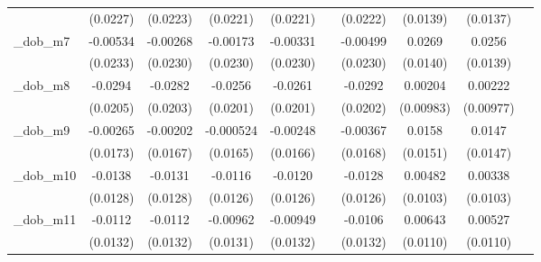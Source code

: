 \begin{table}[htbp]
\begin{tabular}{l*{9}{c}}
            &    (0.0227)         &    (0.0223)         &    (0.0221)         &    (0.0221)         &                     &    (0.0222)         &    (0.0139)         &    (0.0137)         &                     \\
[1em]
\_dob\_m7     &    -0.00534         &    -0.00268         &    -0.00173         &    -0.00331         &                     &    -0.00499         &      0.0269\sym{*}  &      0.0256\sym{*}  &                     \\
            &    (0.0233)         &    (0.0230)         &    (0.0230)         &    (0.0230)         &                     &    (0.0230)         &    (0.0140)         &    (0.0139)         &                     \\
[1em]
\_dob\_m8     &     -0.0294         &     -0.0282         &     -0.0256         &     -0.0261         &                     &     -0.0292         &     0.00204         &     0.00222         &                     \\
            &    (0.0205)         &    (0.0203)         &    (0.0201)         &    (0.0201)         &                     &    (0.0202)         &   (0.00983)         &   (0.00977)         &                     \\
[1em]
\_dob\_m9     &    -0.00265         &    -0.00202         &   -0.000524         &    -0.00248         &                     &    -0.00367         &      0.0158         &      0.0147         &                     \\
            &    (0.0173)         &    (0.0167)         &    (0.0165)         &    (0.0166)         &                     &    (0.0168)         &    (0.0151)         &    (0.0147)         &                     \\
[1em]
\_dob\_m10    &     -0.0138         &     -0.0131         &     -0.0116         &     -0.0120         &                     &     -0.0128         &     0.00482         &     0.00338         &                     \\
            &    (0.0128)         &    (0.0128)         &    (0.0126)         &    (0.0126)         &                     &    (0.0126)         &    (0.0103)         &    (0.0103)         &                     \\
[1em]
\_dob\_m11    &     -0.0112         &     -0.0112         &    -0.00962         &    -0.00949         &                     &     -0.0106         &     0.00643         &     0.00527         &                     \\
            &    (0.0132)         &    (0.0132)         &    (0.0131)         &    (0.0132)         &                     &    (0.0132)         &    (0.0110)         &    (0.0110)         &                     \\

\end{tabular}
\end{table}
